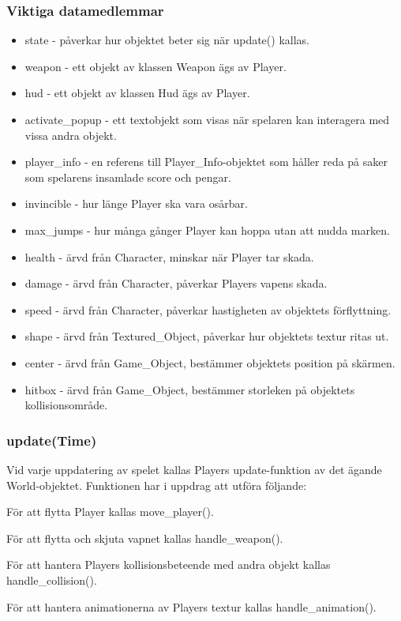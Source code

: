 \documentclass{TDP005mall}
\begin{document}
\subsubsection{Viktiga datamedlemmar}
\begin{itemize}
\item state - påverkar hur objektet beter sig när update() kallas.
\item weapon - ett objekt av klassen Weapon ägs av Player.
\item hud - ett objekt av klassen Hud ägs av Player.
\item activate\_popup - ett textobjekt som visas när spelaren kan interagera med vissa andra objekt.
\item player\_info - en referens till Player\_Info-objektet som håller reda på saker som spelarens insamlade score och pengar.
\item invincible - hur länge Player ska vara osårbar.
\item max\_jumps - hur många gånger Player kan hoppa utan att nudda marken.
\item health - ärvd från Character, minskar när Player tar skada.
\item damage - ärvd från Character, påverkar Players vapens skada.
\item speed - ärvd från Character, påverkar hastigheten av objektets förflyttning.
\item shape - ärvd från Textured\_Object, påverkar hur objektets textur ritas ut.
\item center - ärvd från Game\_Object, bestämmer objektets position på skärmen.
\item hitbox - ärvd från Game\_Object, bestämmer storleken på objektets kollisionsområde.
\end{itemize}

\subsubsection{update(Time)}
Vid varje uppdatering av spelet kallas Players update-funktion av det ägande World-objektet. Funktionen har i uppdrag att utföra följande:

För att flytta Player kallas move\_player().

För att flytta och skjuta vapnet kallas handle\_weapon().

För att hantera Players kollisionsbeteende med andra objekt kallas handle\_collision().

För att hantera animationerna av Players textur kallas handle\_animation().
\end{document}
